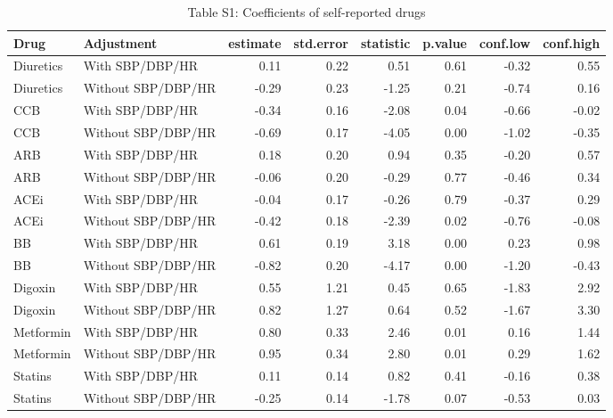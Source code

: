 \documentclass[
]{article}
\begin{document}
\begin{table}

\caption{\label{tab:med-effect-table-2}Table S1: Coefficients of self-reported drugs}
\centering
\begin{tabular}[t]{l|l|r|r|r|r|r|r}
\hline
Drug & Adjustment & estimate & std.error & statistic & p.value & conf.low & conf.high\\
\hline
Diuretics & With SBP/DBP/HR & 0.11 & 0.22 & 0.51 & 0.61 & -0.32 & 0.55\\
\hline
Diuretics & Without SBP/DBP/HR & -0.29 & 0.23 & -1.25 & 0.21 & -0.74 & 0.16\\
\hline
CCB & With SBP/DBP/HR & -0.34 & 0.16 & -2.08 & 0.04 & -0.66 & -0.02\\
\hline
CCB & Without SBP/DBP/HR & -0.69 & 0.17 & -4.05 & 0.00 & -1.02 & -0.35\\
\hline
ARB & With SBP/DBP/HR & 0.18 & 0.20 & 0.94 & 0.35 & -0.20 & 0.57\\
\hline
ARB & Without SBP/DBP/HR & -0.06 & 0.20 & -0.29 & 0.77 & -0.46 & 0.34\\
\hline
ACEi & With SBP/DBP/HR & -0.04 & 0.17 & -0.26 & 0.79 & -0.37 & 0.29\\
\hline
ACEi & Without SBP/DBP/HR & -0.42 & 0.18 & -2.39 & 0.02 & -0.76 & -0.08\\
\hline
BB & With SBP/DBP/HR & 0.61 & 0.19 & 3.18 & 0.00 & 0.23 & 0.98\\
\hline
BB & Without SBP/DBP/HR & -0.82 & 0.20 & -4.17 & 0.00 & -1.20 & -0.43\\
\hline
Digoxin & With SBP/DBP/HR & 0.55 & 1.21 & 0.45 & 0.65 & -1.83 & 2.92\\
\hline
Digoxin & Without SBP/DBP/HR & 0.82 & 1.27 & 0.64 & 0.52 & -1.67 & 3.30\\
\hline
Metformin & With SBP/DBP/HR & 0.80 & 0.33 & 2.46 & 0.01 & 0.16 & 1.44\\
\hline
Metformin & Without SBP/DBP/HR & 0.95 & 0.34 & 2.80 & 0.01 & 0.29 & 1.62\\
\hline
Statins & With SBP/DBP/HR & 0.11 & 0.14 & 0.82 & 0.41 & -0.16 & 0.38\\
\hline
Statins & Without SBP/DBP/HR & -0.25 & 0.14 & -1.78 & 0.07 & -0.53 & 0.03\\
\hline
\end{tabular}
\end{table}
\end{document}
